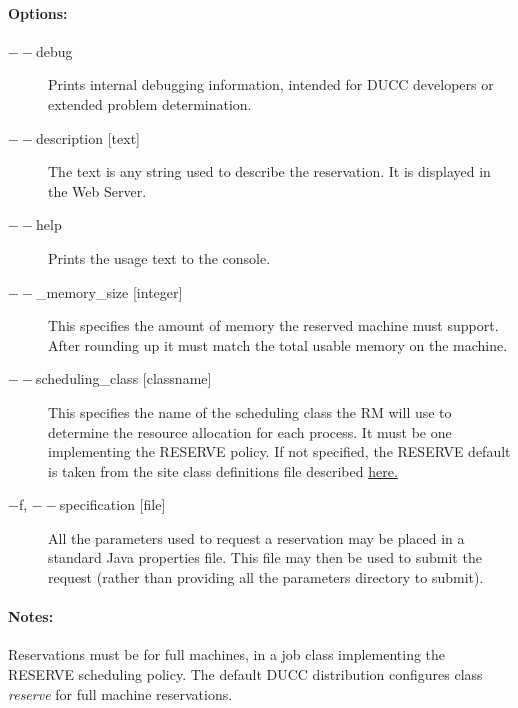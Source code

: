     \paragraph{Options:}
    
        \begin{description}

            \item[$--$debug ]          
              Prints internal debugging information, intended for DUCC developers or extended problem determination.
              
            \item[$--$description {[text]}]               
              The text is any string used to describe the reservation. It is displayed in the Web Server. 
              
            \item[$--$help ]             
              Prints the usage text to the console. 
                            
            \item[$--$_memory\_size {[integer]}]               
              This specifies the amount of memory the reserved machine must support. After rounding
              up it must match the total usable memory on the machine. 

            \item[$--$scheduling\_class {[classname]}]               
              This specifies the name of the scheduling class the RM will use to determine the resource 
              allocation for each process. It must be one implementing the RESERVE policy.
              If not specified, the RESERVE default is taken from the site class definitions file
              described \hyperref[subsubsec:class.configuration]{here.} 
              
            \item[$-$f, $--$specification {[file]}]               
              All the parameters used to request a reservation may be placed in a standard Java 
              properties file. This file may then be used to submit the request (rather than providing all 
              the parameters directory to submit). 

        \end{description}
            
    \paragraph{Notes:}
    Reservations must be for full machines, in a job class implementing the RESERVE scheduling
    policy. The default DUCC distribution configures class {\em reserve} for full machine
    reservations. 


